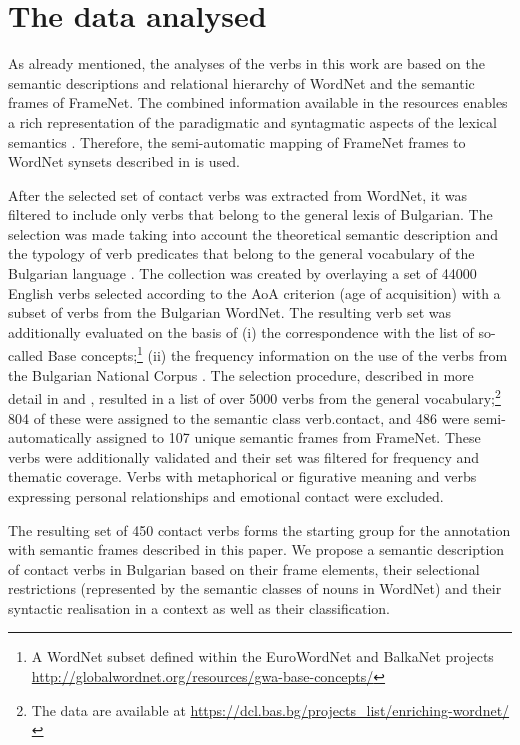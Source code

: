 \documentclass[output=paper,colorlinks,citecolor=brown]{langscibook}
\begin{document}
\section{The data analysed}\label{ch5:sec:2}
As already mentioned, the analyses of the verbs in this work are based on the semantic descriptions and relational hierarchy of WordNet and the semantic frames of FrameNet. The combined information available in the resources enables a rich representation of the paradigmatic and syntagmatic aspects of the lexical semantics \citep{BakerFellbaum:09}. Therefore, the semi-automatic mapping of FrameNet frames to WordNet synsets described in \citet{StoyanovaLeseva:20} is used.

After the selected set of contact verbs was extracted from WordNet, it was filtered to include only verbs that belong to the general lexis of Bulgarian. The selection was made taking into account the theoretical semantic description and the typology of verb predicates that belong to the general vocabulary of the Bulgarian language \citep{KoevaDoychev:2022}. The collection was created by overlaying a set of 44000 English verbs selected according to the AoA criterion (age of acquisition) \citep{BrysbaertBiemiller:17} with a subset of verbs from the Bulgarian WordNet. The resulting verb set was additionally evaluated on the basis of (i) the correspondence with the list of so-called Base concepts;\footnote{A WordNet subset defined within the EuroWordNet and BalkaNet projects \url{http://globalwordnet.org/resources/gwa-base-concepts/}} (ii) the frequency information on the use of the verbs from the Bulgarian National Corpus \citep{Koevaetall:12}. The selection procedure, described in more detail in \citet{KoevaDoychev:2022} and \citep{Todetal:22}, resulted in a list of over 5000 verbs from the general vocabulary;\footnote{The data are available at \url{https://dcl.bas.bg/projects_list/enriching-wordnet/}} 804 of these were assigned to the semantic class verb.contact, and 486 were semi-automatically assigned to 107 unique semantic frames from FrameNet. These verbs were additionally validated and their set was filtered for frequency and thematic coverage. Verbs with metaphorical or figurative meaning and verbs expressing personal relationships and emotional contact were excluded.

The resulting set of 450 contact verbs forms the starting group for the annotation with semantic frames described in this paper. We propose a semantic description of contact verbs in Bulgarian based on their frame elements, their selectional restrictions (represented by the semantic classes of nouns in WordNet) and their syntactic realisation in a context as well as their classification.
\end{document}
